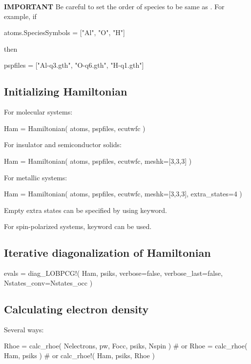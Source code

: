 \textbf{IMPORTANT} Be careful to set the order of species to be same as
. For example, if
\begin{juliacode}
atoms.SpeciesSymbols = ["Al", "O", "H"]
\end{juliacode}
then
\begin{juliacode}
pspfiles = ["Al-q3.gth", "O-q6.gth", "H-q1.gth"]
\end{juliacode}

\subsection{Initializing Hamiltonian}

For molecular systems:
\begin{juliacode}
Ham = Hamiltonian( atoms, pspfiles, ecutwfc )
\end{juliacode}

For insulator and semiconductor solids:
\begin{juliacode}
Ham = Hamiltonian( atoms, pspfiles, ecutwfc, meshk=[3,3,3] )
\end{juliacode}

For metallic systems:
\begin{juliacode}
Ham = Hamiltonian( atoms, pspfiles, ecutwfc, meshk=[3,3,3], extra_states=4 )
\end{juliacode}

Empty extra states can be specified by using  keyword.

For spin-polarized systems,  keyword can be used.


\subsection{Iterative diagonalization of Hamiltonian}

\begin{juliacode}
evals =  diag_LOBPCG!( Ham, psiks, verbose=false, verbose_last=false,
                       Nstates_conv=Nstates_occ )
\end{juliacode}


\subsection{Calculating electron density}

Several ways:
\begin{juliacode}
Rhoe = calc_rhoe( Nelectrons, pw, Focc, psiks, Nspin )
# or
Rhoe = calc_rhoe( Ham, psiks )
# or
calc_rhoe!( Ham, psiks, Rhoe )
\end{juliacode}

